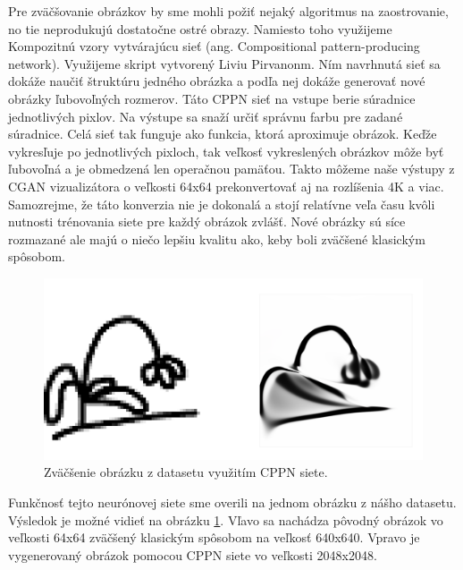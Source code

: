Pre zväčšovanie obrázkov by sme mohli požiť nejaký algoritmus na zaostrovanie, no tie neprodukujú dostatočne ostré obrazy.
Namiesto toho využijeme Kompozitnú vzory vytvárajúcu sieť (ang. Compositional pattern-producing network).
Využijeme skript vytvorený Liviu Pirvanonm.
Ním navrhnutá sieť sa dokáže naučiť štruktúru jedného obrázka a podľa nej dokáže generovať nové obrázky ľubovoľných rozmerov.
Táto CPPN sieť na vstupe berie súradnice jednotlivých pixlov.
Na výstupe sa snaží určiť správnu farbu pre zadané súradnice.
Celá sieť tak funguje ako funkcia, ktorá aproximuje obrázok.
Keďže vykresľuje po jednotlivých pixloch, tak veľkosť vykreslených obrázkov môže byť ľubovoľná a je obmedzená len operačnou pamäťou.
Takto môžeme naše výstupy z CGAN vizualizátora o veľkosti 64x64 prekonvertovať aj na rozlíšenia 4K a viac.
Samozrejme, že táto konverzia nie je dokonalá a stojí relatívne veľa času kvôli nutnosti trénovania siete pre každý obrázok zvlášť.
Nové obrázky sú síce rozmazané ale majú o niečo lepšiu kvalitu ako, keby boli zväčšené klasickým spôsobom.

\begin{figure}[!ht] 
	\centering 
	\includegraphics[width=.8\textwidth]{figures/cppn} 
	\caption{Zväčšenie obrázku z datasetu využitím CPPN siete.}
	\label{cppn}
\end{figure}

Funkčnosť tejto neurónovej siete sme overili na jednom obrázku z nášho datasetu.
Výsledok je možné vidieť na obrázku \ref{cppn}.
Vľavo sa nachádza pôvodný obrázok vo veľkosti 64x64 zväčšený klasickým spôsobom na veľkosť 640x640.
Vpravo je vygenerovaný obrázok pomocou CPPN siete vo veľkosti 2048x2048.
